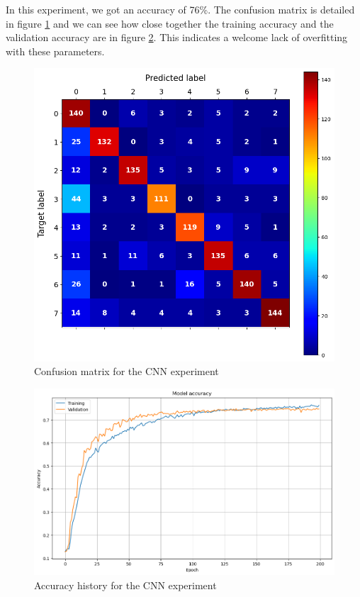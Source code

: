 In this experiment, we got an accuracy of 76\%. The confusion matrix is detailed in figure \ref{fig:cnn640} and we can see how close together the training accuracy and the validation accuracy are in figure \ref{fig:cnn640acc}. This indicates a welcome lack of overfitting with these parameters.

\begin{figure}[htbp!]
  \centering
  \includegraphics[scale=0.6]{figures/ml_cnn640cm.png}
  \caption{Confusion matrix for the CNN experiment}
  \label{fig:cnn640}
\end{figure}

\begin{figure}[htbp!]
  \centering
  \includegraphics[scale=0.6]{figures/ml_cnn640acc.png}
  \caption{Accuracy history for the CNN experiment}
  \label{fig:cnn640acc}
\end{figure}

